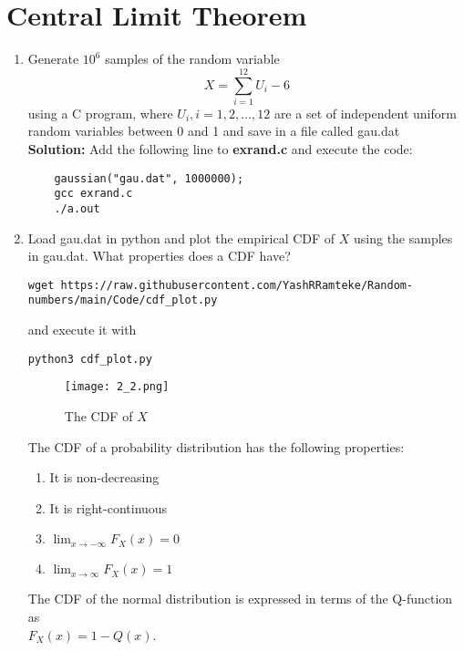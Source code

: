 \documentclass[journal,12pt,twocolumn]{IEEEtran}
\newcommand{\solution}{\noindent \textbf{Solution: }}
\numberwithin{equation}{section}
\renewcommand\thesection{\arabic{section}}
\begin{document}
\section{Central Limit Theorem}
%
\begin{enumerate}[label=\thesection.\arabic*
,ref=\thesection.\theenumi]

\item
Generate $10^6$ samples of the random variable
%
\begin{equation}
X = \sum_{i=1}^{12}U_i -6
\end{equation}
%
using a C program, where $U_i, i = 1,2,\dots, 12$ are  a set of independent uniform random variables between 0 and 1
and save in a file called gau.dat
\\
\solution
Add the following line to \textbf{exrand.c} and execute the code:
\begin{lstlisting}
    gaussian("gau.dat", 1000000);
    gcc exrand.c
    ./a.out
\end{lstlisting}

\item
Load gau.dat in python and plot the empirical CDF of $X$ using the samples in gau.dat. What properties does a CDF have?
\\
\begin{lstlisting}
wget https://raw.githubusercontent.com/YashRRamteke/Random-numbers/main/Code/cdf_plot.py
\end{lstlisting}
and execute it with
\begin{lstlisting}
python3 cdf_plot.py
\end{lstlisting}

\begin{figure}
\centering
\texttt{[image: 2\_2.png]}
\caption{The CDF of $X$}
\label{fig:gauss_pdf}
\end{figure}

The CDF of a probability distribution has the following properties:
		\begin{enumerate}
			\item It is non-decreasing
			\item It is right-continuous
			\item $\lim_{x \to -\infty}F_X(x) = 0$
			\item $\lim_{x \to \infty}F_X(x) = 1$
		\end{enumerate}
The CDF of the normal distribution is expressed in terms of the Q-function as\\ $F_X(x) = 1 - Q(x)$.



\end{enumerate}
\end{document}
